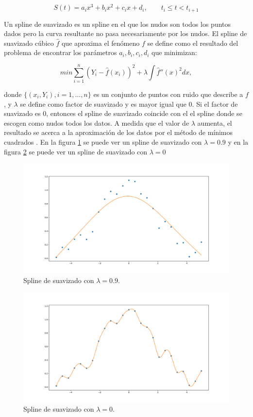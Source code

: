 $$S(t) = a_ix^3 + b_ix^2 + c_ix + d_i, \qquad t_i \leq t < t_{i+1}$$

Un spline de suavizado es un spline en el que los nudos son todos los puntos dados pero la curva resultante no pasa necesariamente por los nudos. El spline de suavizado cúbico $\hat{f}$ que aproxima el fenómeno $f$ se define como el resultado del problema de encontrar los parámetros $a_i, b_i, c_i, d_i$ que minimizan:

$$min \sum_{i=1}^n (Y_i - \hat{f}(x_i))^2 + \lambda \int \hat{f}''(x)^2 dx,$$

donde $\{(x_i, Y_i), i = 1, \dots, n\}$ es un conjunto de puntos con ruido que describe a $f$, y $\lambda$ se define como factor de suavizado y es mayor igual que 0. Si el factor de suavizado es 0, entonces el spline de suavizado coincide con el el spline donde se escogen como nudos todos los datos. A medida que el valor de $\lambda$ aumenta, el resultado se acerca a la aproximación de los datos por el método de mínimos cuadrados \cite{green1993nonparametric}. En la figura \ref{fig:spline_0.1} se puede ver un spline de suavizado con $\lambda=0.9$ y en la figura \ref{fig:spline_1} se puede ver un spline de suavizado con $\lambda=0$

\begin{figure}[h]
    \centering
    \includegraphics[width=\textwidth]{"figures/spline_0.1.pdf"}
    \caption{Spline de suavizado con $\lambda = 0.9$.}
    \label{fig:spline_0.1}
\end{figure}

\begin{figure}[h]
    \centering
    \includegraphics[width=\textwidth]{"figures/spline_1.pdf"}
    \caption{Spline de suavizado con $\lambda = 0$.}
    \label{fig:spline_1}
\end{figure}


